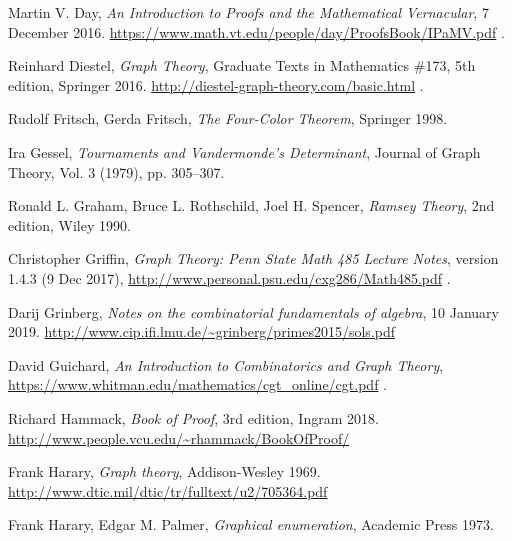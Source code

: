 \documentclass[numbers=enddot,12pt,final,onecolumn,notitlepage]{scrartcl}%
\theoremstyle{definition}
\begin{document}
\begin{thebibliography}{9999999999}
Martin V. Day,
\textit{An Introduction to Proofs and the Mathematical Vernacular},
7 December 2016.
\newline\url{https://www.math.vt.edu/people/day/ProofsBook/IPaMV.pdf} .


Reinhard Diestel, \textit{Graph Theory},
Graduate Texts in Mathematics \#173, 5th edition, Springer 2016.
\newline \url{http://diestel-graph-theory.com/basic.html} .

Rudolf Fritsch, Gerda Fritsch,
\textit{The Four-Color Theorem},
Springer 1998.

Ira Gessel, \textit{Tournaments and
Vandermonde's Determinant}, Journal of Graph Theory, Vol. 3 (1979), pp. 305--307.

Ronald L. Graham, Bruce L. Rothschild,
Joel H. Spencer, \textit{Ramsey Theory}, 2nd edition,
Wiley 1990.

Christopher Griffin,
\textit{Graph Theory: Penn State Math 485 Lecture Notes},
version 1.4.3 (9 Dec 2017),
\newline\url{http://www.personal.psu.edu/cxg286/Math485.pdf} .

Darij Grinberg, \textit{Notes on the combinatorial
fundamentals of algebra}, 10 January 2019.
\newline\url{http://www.cip.ifi.lmu.de/~grinberg/primes2015/sols.pdf}

David Guichard,
\textit{An Introduction to Combinatorics and Graph Theory},
\newline\url{https://www.whitman.edu/mathematics/cgt_online/cgt.pdf} .

Richard Hammack,
\textit{Book of Proof},
3rd edition, Ingram 2018.
\newline\url{http://www.people.vcu.edu/~rhammack/BookOfProof/}

Frank Harary,
\textit{Graph theory},
Addison-Wesley 1969.
\newline\url{http://www.dtic.mil/dtic/tr/fulltext/u2/705364.pdf}

Frank Harary, Edgar M. Palmer,
\textit{Graphical enumeration},
Academic Press 1973.


\end{thebibliography}
\end{document}
